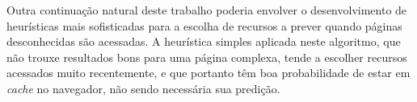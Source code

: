 \documentclass[10pt,twocolumn,letterpaper]{article}
\begin{document}
Outra continuação natural deste trabalho poderia envolver o desenvolvimento de heurísticas mais sofisticadas para a escolha de recursos a prever quando páginas desconhecidas são acessadas. A heurística simples aplicada neste algoritmo, que não trouxe resultados bons para uma página complexa, tende a escolher recursos acessados muito recentemente, e que portanto têm boa probabilidade de estar em \emph{cache} no navegador, não sendo necessária sua predição.

{\small


}
\end{document}
